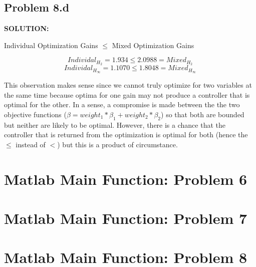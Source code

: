 \documentclass[10pt,a4paper]{article}
\begin{document}
\subsection{Problem 8.d}
\begin{tcolorbox}
\textbf{SOLUTION:}\\
\begin{center}
Individual Optimization Gains $\leq$ Mixed Optimization Gains
\end{center}
$$Individal_{H_2}=1.934 \leq 2.0988 = Mixed_{H_2}$$
$$Individal_{H_\infty} = 1.1070 \leq 1.8048 = Mixed_{H_\infty}$$

This observation makes sense since we cannot truly optimize for two variables at the same time because optima for one gain may not produce a controller that is optimal for the other.  In a sense, a compromise is made between the the two objective functions ($\beta=weight_1*\beta_1+weight_2*\beta_2$) so that both are bounded but neither are likely to be optimal.  However, there is a chance that the controller that is returned from the optimization is optimal for both (hence the $\leq$ instead of $<$) but this is a product of circumstance.


\end{tcolorbox}

\newpage
\section{Matlab Main Function: Problem 6}


\newpage
\section{Matlab Main Function: Problem 7}


\newpage
\section{Matlab Main Function: Problem 8}

\end{document}
